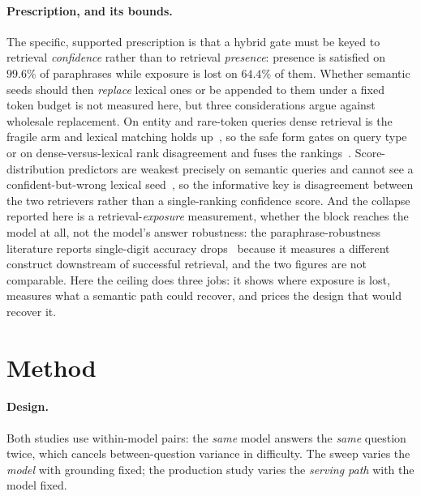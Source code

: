 \documentclass[10pt,twocolumn]{article}
\begin{document}
\paragraph{Prescription, and its bounds.} The specific, supported prescription is that a hybrid
gate must be keyed to retrieval \emph{confidence} rather than to retrieval \emph{presence}: presence
is satisfied on $99.6\%$ of paraphrases while exposure is lost on $64.4\%$ of them. Whether semantic
seeds should then \emph{replace} lexical ones or be appended to them under a fixed token budget is
not measured here, but three considerations argue against wholesale replacement. On entity and
rare-token queries dense retrieval is the fragile arm and lexical matching holds
up~\cite{entityquestions2021}, so the safe form gates on query type or on dense-versus-lexical rank
disagreement and fuses the rankings~\cite{rrf2009}. Score-distribution predictors are weakest
precisely on semantic queries and cannot see a confident-but-wrong lexical seed~\cite{qppneural2023},
so the informative key is disagreement between the two retrievers rather than a single-ranking
confidence score. And the collapse reported here is a retrieval-\emph{exposure} measurement, whether
the block reaches the model at all, not the model's answer robustness: the paraphrase-robustness
literature reports single-digit accuracy drops~\cite{benchrobust2025} because it measures a different
construct downstream of successful retrieval, and the two figures are not comparable. Here the
ceiling does three jobs: it shows where exposure is lost, measures what a semantic path could
recover, and prices the design that would recover it.

\section{Method}\label{sec:method}
\paragraph{Design.} Both studies use within-model pairs: the \emph{same} model answers the \emph{same} question twice, which cancels between-question variance in difficulty. The sweep varies the \emph{model} with grounding fixed; the production study varies the \emph{serving path} with the model fixed.
\end{document}
